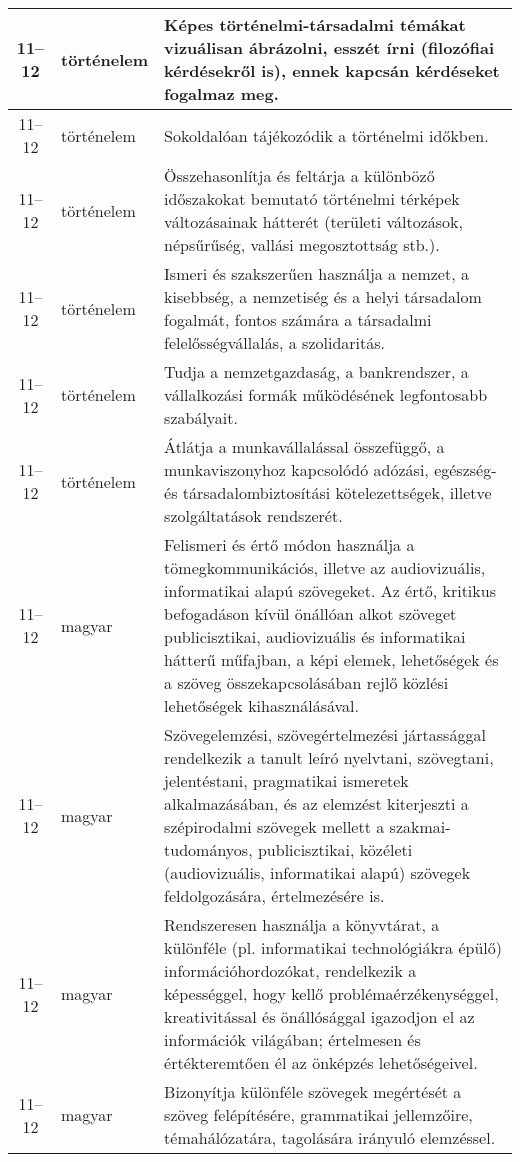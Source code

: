 \begin{small}
\begin{longtable}{c | p{2cm} |  p{11cm} }
              11--12 & történelem & Képes történelmi-társadalmi témákat vizuálisan ábrázolni, esszét írni (filozófiai kérdésekről is), ennek kapcsán kérdéseket fogalmaz meg. \\ \hline
              11--12 & történelem & Sokoldalóan tájékozódik a történelmi időkben. \\ \hline
              11--12 & történelem & Összehasonlítja és feltárja a különböző időszakokat bemutató történelmi térképek változásainak hátterét (területi változások, népsűrűség, vallási megosztottság stb.). \\ \hline
              11--12 & történelem & Ismeri és szakszerűen használja a nemzet, a kisebbség, a nemzetiség és a helyi társadalom fogalmát, fontos számára a társadalmi felelősségvállalás, a szolidaritás. \\ \hline
              11--12 & történelem & Tudja a nemzetgazdaság, a bankrendszer, a vállalkozási formák működésének legfontosabb szabályait. \\ \hline
              11--12 & történelem & Átlátja a munkavállalással összefüggő, a munkaviszonyhoz kapcsolódó adózási, egészség- és társadalombiztosítási kötelezettségek, illetve szolgáltatások rendszerét. \\ \hline
              11--12 & magyar & Felismeri és értő módon használja a tömegkommunikációs, illetve az audiovizuális, informatikai alapú szövegeket. Az értő, kritikus befogadáson kívül önállóan alkot szöveget  publicisztikai, audiovizuális és informatikai hátterű műfajban, a képi elemek, lehetőségek és a szöveg összekapcsolásában rejlő közlési lehetőségek kihasználásával. \\ \hline
              11--12 & magyar & Szövegelemzési, szövegértelmezési jártassággal rendelkezik a tanult leíró nyelvtani, szövegtani, jelentéstani, pragmatikai ismeretek alkalmazásában, és az elemzést kiterjeszti a szépirodalmi szövegek mellett a szakmai-tudományos, publicisztikai, közéleti (audiovizuális, informatikai alapú) szövegek feldolgozására, értelmezésére is. \\ \hline
              11--12 & magyar & Rendszeresen használja a könyvtárat, a különféle (pl. informatikai technológiákra épülő) információhordozókat, rendelkezik a képességgel, hogy kellő problémaérzékenységgel, kreativitással és önállósággal igazodjon el az információk világában; értelmesen és értékteremtően él az önképzés lehetőségeivel. \\ \hline
              11--12 & magyar & Bizonyítja különféle szövegek megértését a szöveg felépítésére, grammatikai jellemzőire, témahálózatára, tagolására irányuló elemzéssel. \\ \hline

\end{longtable}
\end{small}
